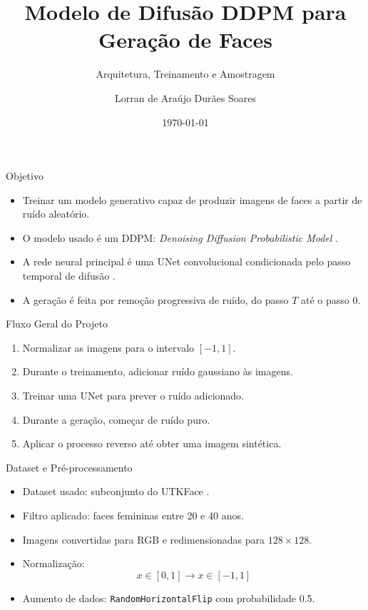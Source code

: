 \documentclass[aspectratio=169]{beamer}
\title[DDPM para Geração de Faces]{Modelo de Difusão DDPM para Geração de Faces}
\subtitle{Arquitetura, Treinamento e Amostragem}
\author{Lorran de Araújo Durães Soares}
\institute{Tópicos Avançados em Redes Neurais Profundas}
\date{\today}
\begin{document}
\begin{frame}
    \titlepage
\end{frame}

\begin{frame}{Objetivo}
    \begin{itemize}
        \item Treinar um modelo generativo capaz de produzir imagens de faces a partir de ruído aleatório.
        \item O modelo usado é um DDPM: \textit{Denoising Diffusion Probabilistic Model} \cite{ho2020ddpm}.
        \item A rede neural principal é uma UNet convolucional condicionada pelo passo temporal de difusão \cite{ronneberger2015unet}.
        \item A geração é feita por remoção progressiva de ruído, do passo $T$ até o passo $0$.
    \end{itemize}
\end{frame}

\begin{frame}{Fluxo Geral do Projeto}
    \begin{enumerate}
        \item Normalizar as imagens para o intervalo $[-1, 1]$.
        \item Durante o treinamento, adicionar ruído gaussiano às imagens.
        \item Treinar uma UNet para prever o ruído adicionado.
        \item Durante a geração, começar de ruído puro.
        \item Aplicar o processo reverso até obter uma imagem sintética.
    \end{enumerate}
\end{frame}

\begin{frame}{Dataset e Pré-processamento}
    \begin{itemize}
        \item Dataset usado: subconjunto do UTKFace \cite{zhang2017utkface}.
        \item Filtro aplicado: faces femininas entre 20 e 40 anos.
        \item Imagens convertidas para RGB e redimensionadas para $128 \times 128$.
        \item Normalização:
        \[
            x \in [0, 1] \rightarrow x \in [-1, 1]
        \]
        \item Aumento de dados: \texttt{RandomHorizontalFlip} com probabilidade 0.5.
    \end{itemize}
\end{frame}
\end{document}
